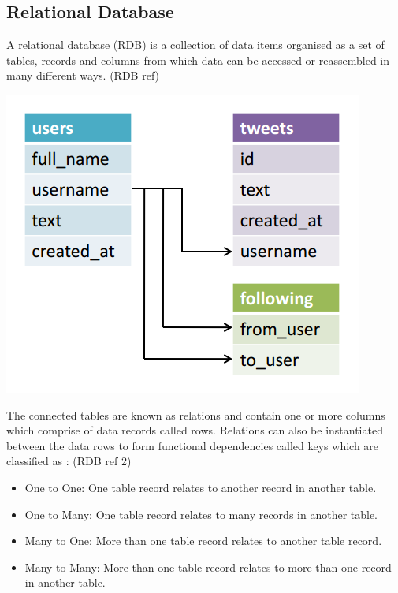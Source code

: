 \subsection{Relational Database}
A relational database (RDB) is a collection of data items organised as a set of tables, records and columns from which data can be accessed or reassembled in many different ways. (RDB ref)  \begin{center}\includegraphics[width=0.75\linewidth]{images/rdbmsmodel}\end{center}The connected tables are known as relations and contain one or more columns which comprise of data records called rows. Relations can also be instantiated between the data rows to form functional dependencies called keys which are classified as : (RDB ref 2)

\begin{itemize}
\item One to One: One table record relates to another record in another table.
\item One to Many: One table record relates to many records in another table.
\item Many to One: More than one table record relates to another table record.
\item Many to Many: More than one table record relates to more than one record in another table.
\end{itemize}





